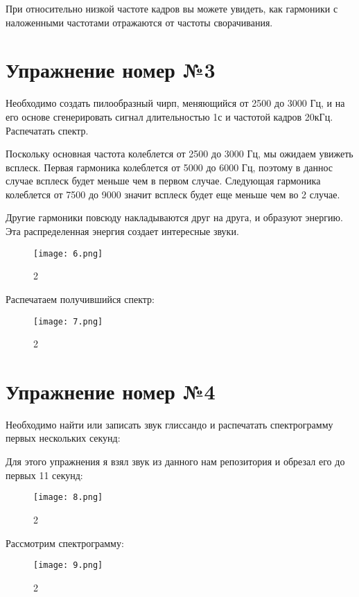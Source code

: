 \documentclass[10pt,a4paper,oneside]{article}
\begin{document}
При относительно низкой частоте кадров вы можете увидеть, как гармоники с наложенными частотами отражаются от частоты сворачивания.

\section{Упражнение номер №3}

Необходимо создать пилообразный чирп, меняющийся от 2500 до 3000 Гц, и на его основе сгенерировать сигнал длительностью 1с и частотой кадров 20кГц. Распечатать спектр.

Поскольку основная частота колеблется от 2500 до 3000 Гц, мы ожидаем увижеть всплеск. Первая гармоника колеблется от 5000 до 6000 Гц, поэтому в даннос случае всплеск будет меньше чем в первом случае. Следующая гармоника колеблется от 7500 до 9000 значит всплеск будет еще меньше чем во 2 случае.

Другие гармоники повсюду накладываются друг на друга, и образуют энергию. Эта распределенная энергия создает интересные звуки.

\begin{figure}[H]
        \centering
        \texttt{[image: 6.png]}
        \caption{2}
        \label{fig:first}
\end{figure}
 
 Распечатаем получившийся спектр: 
 
\begin{figure}[H]
        \centering
        \texttt{[image: 7.png]}
        \caption{2}
        \label{fig:first}
\end{figure}

\section{Упражнение номер №4}

Необходимо найти или записать звук глиссандо и распечатать спектрограмму первых нескольких секунд:

Для этого упражнения я взял звук из данного нам репозитория и обрезал его до первых 11 секунд: 

\begin{figure}[H]
        \centering
        \texttt{[image: 8.png]}
        \caption{2}
        \label{fig:first}
\end{figure}

Рассмотрим спектрограмму: 

\begin{figure}[H]
        \centering
        \texttt{[image: 9.png]}
        \caption{2}
        \label{fig:first}
\end{figure}
\end{document}
